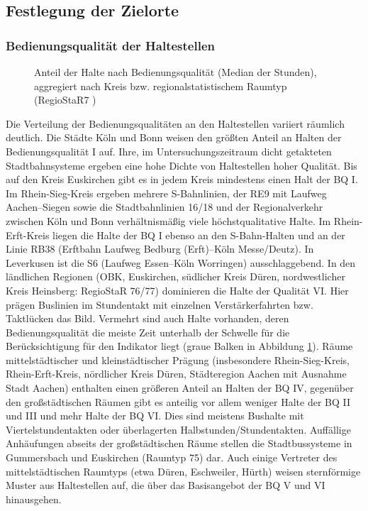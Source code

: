 \documentclass[11pt,pdftex,a4paper]{scrartcl}
\begin{document}
\subsection{Festlegung der Zielorte}
\subsubsection{Bedienungsqualität der Haltestellen}
\label{sec:resultsbedienung}
	\begin{figure}[!hb]
	\centering
	\caption[Halte je Bedienungsqualität]{Anteil der Halte nach Bedienungsqualität (Median der Stunden), aggregiert nach Kreis bzw. regionalstatistischem Raumtyp (RegioStaR7 \parencite{BMDVRegioStaR2026})}
	
	\label{fig:stops_bq_hour}
	\end{figure}
Die Verteilung der Bedienungsqualitäten an den Haltestellen variiert räumlich deutlich. Die Städte Köln und Bonn weisen den größten Anteil an Halten der Bedienungsqualität I auf. Ihre, im Untersuchungszeitraum dicht getakteten Stadtbahnsysteme ergeben eine hohe Dichte von Haltestellen hoher Qualität. Bis auf den Kreis Euskirchen gibt es in jedem Kreis mindestens einen Halt der BQ I. Im Rhein-Sieg-Kreis ergeben mehrere S-Bahnlinien, der RE9 mit Laufweg Aachen--Siegen sowie die Stadtbahnlinien 16/18 und der Regionalverkehr zwischen Köln und Bonn verhältnismäßig viele höchstqualitative Halte. Im Rhein-Erft-Kreis liegen die Halte der BQ I ebenso an den S-Bahn-Halten und an der Linie RB38 (Erftbahn Laufweg Bedburg (Erft)--Köln Messe/Deutz). In Leverkusen ist die S6 (Laufweg Essen--Köln Worringen) ausschlaggebend. 
In den ländlichen Regionen (OBK, Euskirchen, südlicher Kreis Düren, nordwestlicher Kreis Heinsberg: RegioStaR 76/77) dominieren die Halte der Qualität VI. Hier prägen Buslinien im Stundentakt mit einzelnen Verstärkerfahrten bzw. Taktlücken das Bild. Vermehrt sind auch Halte vorhanden, deren Bedienungsqualität die meiste Zeit unterhalb der Schwelle für die Berücksichtigung für den Indikator liegt (graue Balken in Abbildung \ref{fig:stops_bq_hour}). Räume mittelstädtischer und kleinstädtischer Prägung (insbesondere Rhein-Sieg-Kreis, Rhein-Erft-Kreis, nördlicher Kreis Düren, Städteregion Aachen mit Ausnahme Stadt Aachen) enthalten einen größeren Anteil an Halten der BQ IV, gegenüber den großstädtischen Räumen gibt es anteilig vor allem weniger Halte der BQ II und III und mehr Halte der BQ VI. Dies sind meistens Bushalte mit Viertelstundentakten oder überlagerten Halbstunden/Stundentakten. Auffällige Anhäufungen abseits der großstädtischen Räume stellen die Stadtbussysteme in Gummersbach und Euskirchen (Raumtyp 75) dar. Auch einige Vertreter des mittelstädtischen Raumtyps (etwa Düren, Eschweiler, Hürth) weisen sternförmige Muster aus Haltestellen auf, die über das Basisangebot der BQ V und VI hinausgehen.
\end{document}
